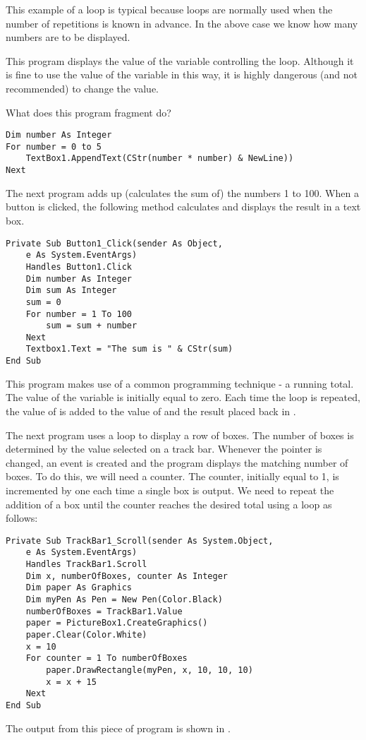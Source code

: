 		This example of a  loop is typical because  loops are normally used when the number of repetitions is known in advance. In the above case we know how many numbers are to be displayed.

		
		This program displays the value of the variable  controlling the loop. Although it is fine to use the value of the variable in this way, it is highly dangerous (and not recommended) to change the value.

		\begin{stqb}
			\begin{STQ}
				\item	What does this program fragment do?
					\begin{lstlisting}
Dim number As Integer
For number = 0 to 5
	TextBox1.AppendText(CStr(number * number) & NewLine))
Next
					\end{lstlisting}
			\end{STQ}
		\end{stqb}
		The next program adds up (calculates the sum of) the numbers 1 to 100. When a button is clicked, the following method calculates and displays the result in a text box.
		\begin{lstlisting}
Private Sub Button1_Click(sender As Object,
	e As System.EventArgs)
	Handles Button1.Click
	Dim number As Integer
	Dim sum As Integer
	sum = 0
	For number = 1 To 100
		sum = sum + number
	Next
	Textbox1.Text = "The sum is " & CStr(sum)
End Sub
		\end{lstlisting}
		This program makes use of a common programming technique - a running total. The value of the variable  is initially equal to zero. Each time the loop is repeated, the value of  is added to the value of  and the result placed back in .

		The next program uses a  loop to display a row of boxes. The number of boxes is determined by the value selected on a track bar. Whenever the pointer is changed, an event is created and the program displays the matching number of boxes. To do this, we will need a counter. The counter, initially equal to 1, is incremented by one each time a single box is output. We need to repeat the addition of a box until the counter reaches the desired total using a  loop as follows:
		\begin{lstlisting}
Private Sub TrackBar1_Scroll(sender As System.Object,
	e As System.EventArgs)
	Handles TrackBar1.Scroll
	Dim x, numberOfBoxes, counter As Integer
	Dim paper As Graphics
	Dim myPen As Pen = New Pen(Color.Black)
	numberOfBoxes = TrackBar1.Value
	paper = PictureBox1.CreateGraphics()
	paper.Clear(Color.White)	
	x = 10
	For counter = 1 To numberOfBoxes
		paper.DrawRectangle(myPen, x, 10, 10, 10)
		x = x + 15
	Next
End Sub
		\end{lstlisting}
		The output from this piece of program is shown in .
		
